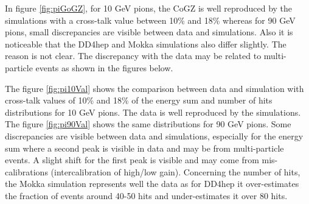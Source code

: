 In figure \ref{fig:piGoGZ}, for 10 GeV pions, the CoGZ is well reproduced by the simulations with a cross-talk value between 10\% and 18\% whereas for 90 GeV pions, small discrepancies are visible between data and simulations. Also it is noticeable that the DD4hep and Mokka simulations also differ slightly. The reason is not clear. The discrepancy with the data may be related to multi-particle events as shown in the figures below.

The figure \ref{fig:pi10Val} shows the comparison between data and simulation with cross-talk values of 10\% and 18\% of the energy sum and number of hits distributions for 10 GeV pions. The data is well reproduced by the simulations. The figure \ref{fig:pi90Val} shows the same distributions for 90 GeV pions. Some discrepancies are visible between data and simulations, especially for the energy sum where a second peak is visible in data and may be from multi-particle events. A slight shift for the first peak is visible and may come from mis-calibrations (intercalibration of high/low gain). Concerning the number of hits, the Mokka simulation represents well the data as for DD4hep it over-estimates the fraction of events around 40-50 hits and under-estimates it over 80 hits.


